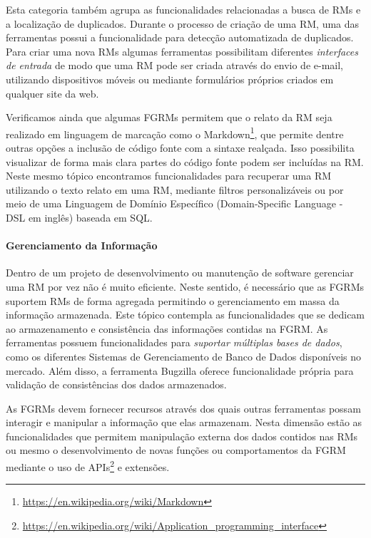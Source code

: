 Esta categoria também agrupa as funcionalidades relacionadas a busca de RMs e a
localização de duplicados. Durante o processo de criação de uma RM, uma das
ferramentas possui a funcionalidade  para detecção automatizada de duplicados.
Para criar uma nova RMs algumas ferramentas possibilitam diferentes
\textit{interfaces de entrada} de modo que uma RM pode ser criada através do
envio de e-mail, utilizando dispositivos móveis ou mediante formulários próprios
criados em qualquer site da web.

Verificamos ainda que algumas FGRMs permitem que o relato da RM seja realizado
em linguagem de marcação como o
Markdown\footnote{\url{https://en.wikipedia.org/wiki/Markdown}}, que permite
dentre outras opções a inclusão de código fonte com a sintaxe realçada. Isso
possibilita visualizar de forma mais clara partes do código fonte podem ser
incluídas na RM\@. Neste mesmo tópico encontramos funcionalidades para recuperar
uma RM utilizando o texto relato em uma RM, mediante filtros personalizáveis ou
por meio de uma Linguagem de Domínio Específico (Domain-Specific Language \@-\@
DSL em inglês) baseada em SQL\@.

\paragraph{Gerenciamento da Informação}
\label{par:gerenciamento_da_informação}

Dentro de um projeto de desenvolvimento ou manutenção de software gerenciar uma
RM por vez não é muito eficiente. Neste sentido, é necessário que as FGRMs
suportem RMs de forma agregada permitindo o gerenciamento em massa da
informação armazenada. Este tópico contempla as funcionalidades que se dedicam
ao armazenamento e consistência das informações contidas na FGRM\@. As ferramentas
possuem funcionalidades para \textit{suportar múltiplas bases de dados}, como os
diferentes Sistemas de Gerenciamento de Banco de Dados disponíveis no mercado.
Além disso, a ferramenta Bugzilla oferece funcionalidade própria para validação
de consistências dos dados armazenados.

As FGRMs devem fornecer recursos através dos quais outras ferramentas possam
interagir e manipular a informação que elas armazenam. Nesta dimensão estão as
funcionalidades que permitem manipulação externa dos dados contidos nas RMs ou
mesmo o desenvolvimento de novas funções ou comportamentos da FGRM mediante o
uso de
APIs\footnote{\url{https://en.wikipedia.org/wiki/Application_programming_interface}}
e extensões.

